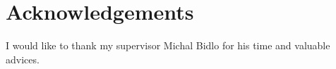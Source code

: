 \documentclass{ExcelAtFIT}
\begin{document}
\section*{Acknowledgements}
I would like to thank my supervisor Michal Bidlo for his time and valuable advices.




\end{document}
